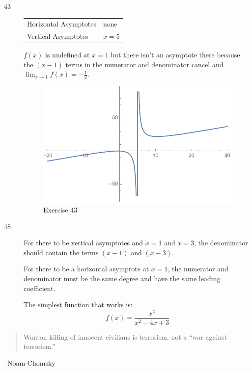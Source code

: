 \documentclass[letterpaper]{exam}
\begin{document}
\begin{description}
      \item[43]
        \begin{tabular}[H]{ll}
          \toprule
          Horizontal Asymptotes & none \\
          Vertical Asymptotes   & $x = 5$ \\
          \bottomrule
        \end{tabular}

        $f(x)$ is undefined at $x = 1$ but there isn't an asymptote there because the
        $(x - 1)$ terms in the numerator and denominator cancel and 
        $\lim_{x \to 1} f(x) = -\frac{1}{2}$.

        \begin{figure}[H]
          \centering
          \includegraphics[scale = 0.5]{ex43.pdf}
          \caption{Exercise 43}
          \label{fig:ex43}
        \end{figure}

      \item[48] For there to be vertical asymptotes and $x = 1$ and $x = 3$, the
        denominator should contain the terms $(x - 1)$ and $(x - 3)$.

        For there to be a horizontal asymptote at $x = 1$, the numerator and denominator
        must be the same degree and have the same leading coefficient.

        The simplest function that works is:
        \[
          \boxed{ f(x) = \frac{x^2}{x^2 - 4x + 3} }
        \]
    \end{description}

  \else
    \vspace{10 cm}
    \begin{quote}
      \begin{em}
        Wanton killing of innocent civilians is terrorism, not a ``war against
        terrorism.'' 
      \end{em}
    \end{quote}
    \hspace{1 cm} --Noam Chomsky
  \fi
\end{document}
